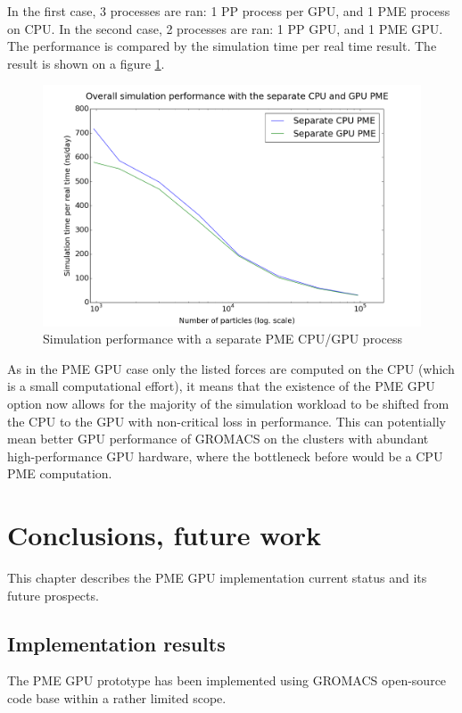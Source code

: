 \documentclass[12pt,a4paper]{report}
\begin{document}
In the first case, 3 processes are ran: 1 PP process per GPU, and 1 PME process on CPU. In the second case, 2 processes are ran: 1 PP GPU, and 1 PME GPU. The performance is compared by the simulation time per real time result. The result is shown on a figure \ref{fig:sepGPU}.


\FloatBarrier
\begin{figure} [h!]
    \centering
    \includegraphics[width=1\textwidth]{pics/GPUCPU.png}
    \caption{Simulation performance with a separate PME CPU/GPU process}
    \label{fig:sepGPU}
\end{figure}
\FloatBarrier

As in the PME GPU case only the listed forces are computed on the CPU (which is a small computational effort), it means that the existence of the PME GPU option now allows for the majority of the simulation workload to be shifted from the CPU to the GPU with non-critical loss in performance. This can potentially mean better GPU performance of GROMACS on the clusters with abundant high-performance GPU hardware, where the bottleneck before would be a CPU PME computation.
\fi

\newpage
\chapter{Conclusions, future work}
This chapter describes the PME GPU implementation current status and its future prospects.

\section{Implementation results}
The PME GPU prototype has been implemented using GROMACS open-source code base within a rather limited scope. 
\end{document}
